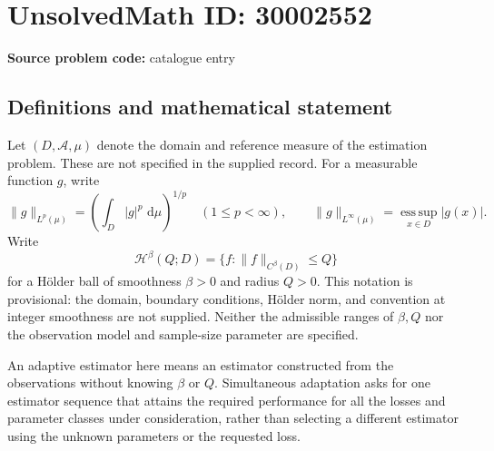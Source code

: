 \documentclass[11pt]{article}
\newcommand{\dd}{\,\mathrm{d}}
\begin{document}
\section*{UnsolvedMath ID: 30002552}
\textbf{Source problem code:} catalogue entry
\subsection{Definitions and mathematical statement}
Let \((D,\mathcal A,\mu)\) denote the domain and reference measure of the estimation problem. These are not specified in the supplied record. For a measurable function \(g\), write
\[
\|g\|_{L^p(\mu)}=\left(\int_D |g|^p\,\dd\mu\right)^{1/p}\quad(1\le p<\infty),\qquad
\|g\|_{L^\infty(\mu)}=\operatorname*{ess\,sup}_{x\in D}|g(x)|.
\]
Write
\[
\mathcal H^\beta(Q;D)=\{f:\|f\|_{C^\beta(D)}\le Q\}
\]
for a H\"older ball of smoothness \(\beta>0\) and radius \(Q>0\). This notation is provisional: the domain, boundary conditions, H\"older norm, and convention at integer smoothness are not supplied. Neither the admissible ranges of \(\beta,Q\) nor the observation model and sample-size parameter are specified.

An adaptive estimator here means an estimator constructed from the observations without knowing \(\beta\) or \(Q\). Simultaneous adaptation asks for one estimator sequence that attains the required performance for all the losses and parameter classes under consideration, rather than selecting a different estimator using the unknown parameters or the requested loss.
\end{document}
